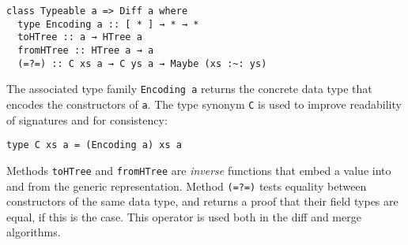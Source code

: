\documentclass{sigplanconf}
\theoremstyle{plain}
\newtheorem{definition}{Definition}
\begin{document}
\begin{verbatim}
class Typeable a => Diff a where
  type Encoding a :: [ * ] → * → *
  toHTree :: a → HTree a
  fromHTree :: HTree a → a
  (=?=) :: C xs a → C ys a → Maybe (xs :~: ys)
\end{verbatim}
The associated type family \texttt{Encoding a} returns the concrete
data type that encodes the constructors of \texttt{a}.
%
The type synonym \texttt{C} is used to improve readability of signatures
and for consistency:
\begin{verbatim}
type C xs a = (Encoding a) xs a
\end{verbatim}
%
Methods \texttt{toHTree} and \texttt{fromHTree} are \emph{inverse}
functions that embed a value into and from the generic representation.
% 
%
%
%
%
Method \texttt{(=?=)} tests equality between constructors of the same
data type, and returns a proof that their field types are equal, if
this is the case. This operator is used both in the diff and merge
algorithms.
%

\end{document}
